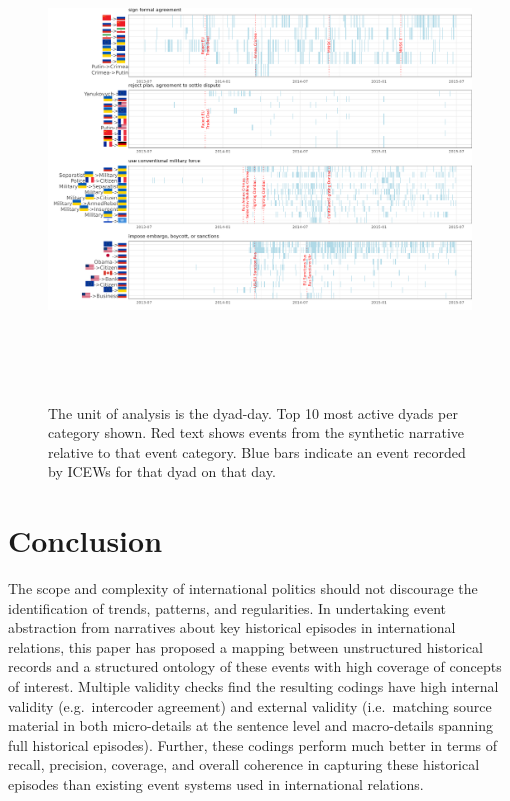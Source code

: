\documentclass{article}
\begin{document}
\begin{figure}
\hypertarget{fig-precision-icews}{%
\centering
\includegraphics[width=7in,height=5in]{p_precision_icews.png}
\caption{The unit of analysis is the dyad-day. Top 10 most active dyads
per category shown. Red text shows events from the synthetic narrative
relative to that event category. Blue bars indicate an event recorded by
ICEWs for that dyad on that day.}\label{fig-precision-icews}
}
\end{figure}

\hypertarget{conclusion}{%
\section{Conclusion}\label{conclusion}}

The scope and complexity of international politics should not discourage
the identification of trends, patterns, and regularities. In undertaking
event abstraction from narratives about key historical episodes in
international relations, this paper has proposed a mapping between
unstructured historical records and a structured ontology of these
events with high coverage of concepts of interest. Multiple validity
checks find the resulting codings have high internal validity
(e.g.~intercoder agreement) and external validity (i.e.~matching source
material in both micro-details at the sentence level and macro-details
spanning full historical episodes). Further, these codings perform much
better in terms of recall, precision, coverage, and overall coherence in
capturing these historical episodes than existing event systems used in
international relations.
\end{document}
